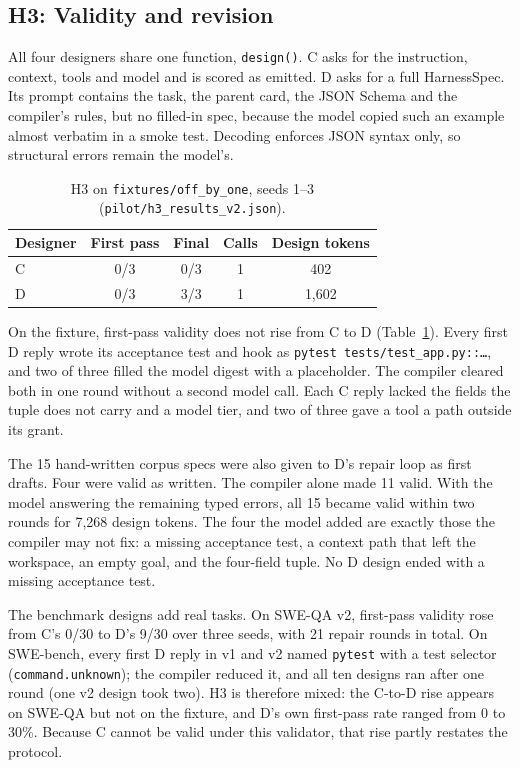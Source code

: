 \documentclass[sigconf,nonacm]{acmart}
\newcommand{\artifact}[1]{\nolinkurl{#1}}
\begin{document}
\subsection{H3: Validity and revision}
All four designers share one function, \texttt{design()}. C asks for the instruction, context, tools and model and is scored as
emitted. D asks for a full HarnessSpec. Its prompt contains the task, the
parent card, the JSON Schema and the compiler's rules, but no filled-in spec,
because the model copied such an example almost verbatim in a smoke test.
Decoding enforces JSON syntax only, so structural errors remain the model's.

\begin{table}[t]
\caption{H3 on \artifact{fixtures/off_by_one}, seeds 1--3
(\artifact{pilot/h3_results_v2.json}).}
\label{tab:h3}
\centering
\begin{tabular}{lcccc}
\toprule
Designer & First pass & Final & Calls & Design tokens \\
\midrule
C & 0/3 & 0/3 & 1 & 402 \\
D & 0/3 & 3/3 & 1 & 1,602 \\
\bottomrule
\end{tabular}
\end{table}

On the fixture, first-pass validity does not rise from C to D
(Table~\ref{tab:h3}). Every first D reply wrote its acceptance test and
hook as \texttt{pytest tests/test\_app.py::\ldots}, and two of three filled
the model digest with a placeholder. The compiler cleared both in one round
without a second model call. Each C reply lacked the fields the tuple does not
carry and a model tier, and two of three gave a tool a path outside its grant.

The 15 hand-written corpus specs were also given to D's repair loop as first
drafts. Four were valid as written. The compiler alone made 11 valid. With the
model answering the remaining typed errors, all 15 became valid within two
rounds for 7,268 design tokens. The four the model added are exactly those the
compiler may not fix: a missing acceptance test, a context path that left the
workspace, an empty goal, and the four-field tuple. No D design ended with a
missing acceptance test.

The benchmark designs add real tasks. On SWE-QA v2, first-pass validity
rose from C's 0/30 to D's 9/30 over three seeds, with 21 repair rounds in
total. On SWE-bench, every first D reply in v1 and v2 named \texttt{pytest}
with a test selector (\texttt{command.unknown}); the compiler reduced it, and
all ten designs ran after one round (one v2 design took two). H3 is therefore
mixed: the C-to-D rise appears on SWE-QA but not on the fixture, and D's own
first-pass rate ranged from 0 to 30\%. Because C cannot be valid under this
validator, that rise partly restates the protocol.
\end{document}
